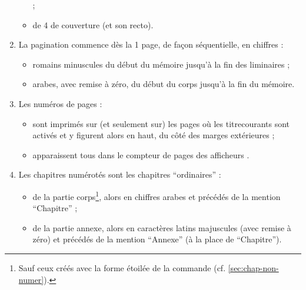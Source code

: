 \begin{enumerate}
\begin{itemize}
{    } ;
  \item de 4\ieme{} de couverture (et son recto).
  \end{itemize}
\item La \gls{pagination} commence dès la 1\iere{} page, de façon
  séquentielle, en chiffres :
  \begin{itemize}
  \item romains minuscules du début du mémoire jusqu'à la fin des
    \glspl{liminaire} ;
  \item arabes, avec remise à zéro, du début du corps jusqu'à la fin du
    mémoire.
  \end{itemize}
\item Les numéros de pages :
  \begin{itemize}
  \item sont imprimés sur (et seulement sur) les pages où les
    \glspl{titrecourant} sont activés et y figurent alors en haut, du côté des
    marges extérieures ;
  \item apparaissent tous dans le compteur de pages des afficheurs
    \pdf.
  \end{itemize}
\item Les chapitres numérotés sont les chapitres \enquote{ordinaires} :
  \begin{itemize}
  \item de la partie corps\footnote{Sauf ceux créés avec la forme étoilée de la
      commande  (cf. \vref{sec:chap-non-numer}).}, alors
    en chiffres arabes et précédés de la mention \enquote{Chapitre} ;
  \item de la partie annexe, alors en caractères latins majuscules (avec remise
    à zéro) et précédés de la mention \enquote{Annexe} (à la place de \enquote{Chapitre}).
  \end{itemize}
\end{enumerate}

%
\iffalse
\fi
